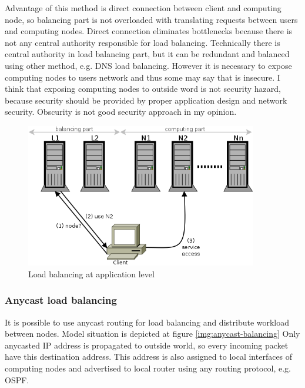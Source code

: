 Advantage of this method is direct connection between client and computing node, so balancing part is not overloaded with translating requests between users and computing nodes. Direct connection eliminates bottlenecks because there is not any central authority responsible for load balancing. Technically there is central authority in load balancing part, but it can be redundant and balanced using other method, e.g. \Ac{DNS} load balancing.  However it is necessary to expose computing nodes to users network and thus some may say that is insecure. I think that exposing computing nodes to outside word is not security hazard, because security should be provided by proper application design and network security. Obscurity is not good security approach in my opinion.

\begin{figure}[htb]
	\begin{center}
	\includegraphics[width=0.9\textwidth]{balancing-application.png}
	\end{center}
	\caption{Load balancing at application level}
	\label{img:balancing-application}
\end{figure}

\subsubsection{Anycast load balancing}
It is possible to use anycast routing for load balancing and distribute workload between nodes. Model situation is depicted at figure \ref{img:anycast-balancing} Only anycasted \Ac{IP} address is propagated to outside world, so every incoming packet have this destination address. This address is also assigned to local interfaces of computing nodes and advertised to local router using any routing protocol, e.g. \Ac{OSPF}. 

